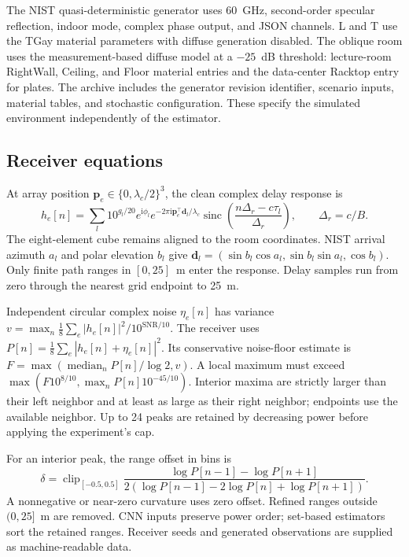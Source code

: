 \documentclass[10pt]{article}
\begin{document}
The NIST quasi-deterministic generator uses 60~GHz, second-order specular reflection, indoor mode, complex phase output, and JSON channels. L and T use the TGay material parameters with diffuse generation disabled. The oblique room uses the measurement-based diffuse model at a $-25$~dB threshold: lecture-room RightWall, Ceiling, and Floor material entries and the data-center Racktop entry for plates. The archive includes the generator revision identifier, scenario inputs, material tables, and stochastic configuration. These specify the simulated environment independently of the estimator.

\subsection{Receiver equations}
At array position $\bm p_e\in\{0,\lambda_c/2\}^3$, the clean complex delay response is
\begin{equation}
h_e[n]=\sum_l 10^{g_l/20}e^{\mathrm i\phi_l}
e^{-2\pi\mathrm i\bm p_e^\top\bm d_l/\lambda_c}
\operatorname{sinc}\!\left(\frac{n\Delta_r-c\tau_l}{\Delta_r}\right),
\qquad \Delta_r=c/B.
\end{equation}
The eight-element cube remains aligned to the room coordinates. NIST arrival azimuth $a_l$ and polar elevation $b_l$ give $\bm d_l=(\sin b_l\cos a_l,\sin b_l\sin a_l,\cos b_l)$. Only finite path ranges in $[0,25]$~m enter the response. Delay samples run from zero through the nearest grid endpoint to 25~m.

Independent circular complex noise $\eta_e[n]$ has variance $v=\max_n\frac18\sum_e|h_e[n]|^2/10^{\mathrm{SNR}/10}$. The receiver uses $P[n]=\frac18\sum_e|h_e[n]+\eta_e[n]|^2$. Its conservative noise-floor estimate is $F=\max(\operatorname{median}_n P[n]/\log2,v)$. A local maximum must exceed $\max(F10^{8/10},\max_nP[n]10^{-45/10})$. Interior maxima are strictly larger than their left neighbor and at least as large as their right neighbor; endpoints use the available neighbor. Up to 24 peaks are retained by decreasing power before applying the experiment's cap.

For an interior peak, the range offset in bins is
\begin{equation}
\delta=\operatorname{clip}_{[-0.5,0.5]}
\frac{\log P[n-1]-\log P[n+1]}{2(\log P[n-1]-2\log P[n]+\log P[n+1])}.
\end{equation}
A nonnegative or near-zero curvature uses zero offset. Refined ranges outside $(0,25]$~m are removed. CNN inputs preserve power order; set-based estimators sort the retained ranges. Receiver seeds and generated observations are supplied as machine-readable data.
\end{document}

